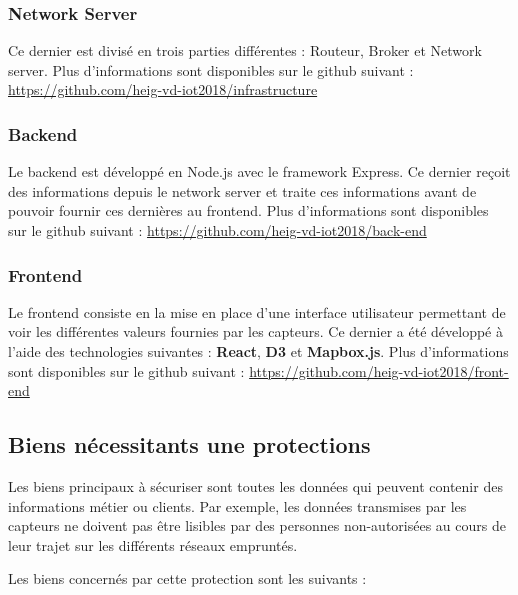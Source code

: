 \documentclass[12pt]{article}
\begin{document}
\subsubsection{Network Server}

Ce dernier est divisé en trois parties différentes : Routeur, Broker et Network server.
Plus d'informations sont disponibles sur le github suivant : \url{https://github.com/heig-vd-iot2018/infrastructure}
\subsubsection{Backend}

Le backend est développé en Node.js avec le framework Express. Ce dernier reçoit des informations depuis le network server et traite ces informations avant de pouvoir fournir ces dernières au frontend.
Plus d'informations sont disponibles sur le github suivant : \url{https://github.com/heig-vd-iot2018/back-end}

\subsubsection{Frontend}
Le frontend consiste en la mise en place d'une interface utilisateur permettant de voir les différentes valeurs fournies par les capteurs. Ce dernier a été développé à l'aide des technologies suivantes : \textbf{React}, \textbf{D3} et \textbf{Mapbox.js}.
Plus d'informations sont disponibles sur le github suivant : \url{https://github.com/heig-vd-iot2018/front-end}

\newpage
\subsection{Biens nécessitants une protections}

Les biens principaux à sécuriser sont toutes les données qui peuvent contenir des informations métier ou clients. Par exemple, les données transmises par les capteurs ne doivent pas être lisibles par des personnes non-autorisées au cours de leur trajet sur les différents réseaux empruntés.

Les biens concernés par cette protection sont les suivants :
\end{document}
